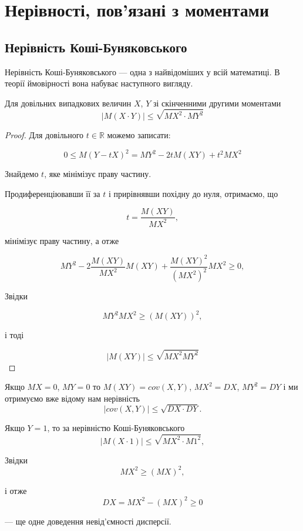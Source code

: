 \section{Нерівності, пов'язані з моментами}

\subsection{Нерівність Коші-Буняковського}

Нерівність Коші-Буняковського --- одна з  найвідоміших
у всій математиці.
В теорії ймовірності вона набуває наступного вигляду.

\begin{theorem}
    Для довільних випадкових величин $X$, $Y$ зі скінченними другими
    моментами
    \begin{equation}
        |M(X \cdot Y)| \leqslant \sqrt{MX^2 \cdot MY^2}
    \end{equation}
\end{theorem}
\begin{proof}
    Для довільного $t \in \mathbb{R}$ можемо записати:

    $$0 \leqslant  M(Y - tX)^2 = MY^2 - 2tM(XY) + t^2 MX^2$$
    
    Знайдемо $t$, яке мінімізує праву частину.
    
    Продиференціювавши її за $t$ і прирівнявши похідну до
    нуля, отримаємо, що

    $$t = \dfrac{M(XY)}{MX^2},$$
    
    мінімізує праву частину, а отже

    $$MY^2 - 2 \dfrac{M(XY)}{MX^2} M(XY) + \dfrac{M(XY)^2}{(MX^2)^2}MX^2 \geqslant 0,$$
    
    Звідки 

    $$MY^2MX^2 \geqslant (M(XY))^2,$$
    
    і тоді

    $$|M(XY)| \leqslant \sqrt{MX^2 MY^2}$$
\end{proof}

\begin{example}
    Якщо $MX = 0$, $MY = 0$ то
    $M(XY) = cov(X, Y)$, $MX^2 = DX$, $MY^2 = DY$
    і ми отримуємо вже відому нам нерівність 
    $$|cov(X, Y)| \leqslant \sqrt{DX \cdot DY}.$$
\end{example}

\begin{example}
    Якщо $Y = 1$, то за нерівністю Коші-Буняковського
    $$|M(X \cdot 1)| \leqslant \sqrt{MX^2 \cdot M1^2},$$
    
    Звідки 
    $$MX^2 \geqslant (MX)^2,$$
    
    і отже
    $$DX = MX^2 - (MX)^2 \geqslant 0$$
    
    --- ще одне доведення невід'ємності дисперсії.
\end{example}

